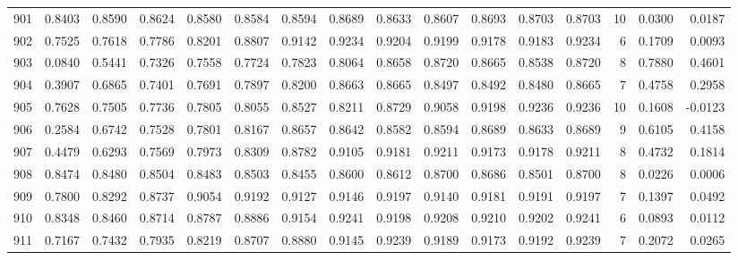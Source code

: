\begin{tabular}{lrrrrrrrrrrrrrrr}
901 &      0.8403 &  0.8590 &  0.8624 &  0.8580 &  0.8584 &  0.8594 &  0.8689 &  0.8633 &  0.8607 &  0.8693 &   0.8703 &     0.8703 &     10 &                    0.0300 &                     0.0187 \\
902 &      0.7525 &  0.7618 &  0.7786 &  0.8201 &  0.8807 &  0.9142 &  0.9234 &  0.9204 &  0.9199 &  0.9178 &   0.9183 &     0.9234 &      6 &                    0.1709 &                     0.0093 \\
903 &      0.0840 &  0.5441 &  0.7326 &  0.7558 &  0.7724 &  0.7823 &  0.8064 &  0.8658 &  0.8720 &  0.8665 &   0.8538 &     0.8720 &      8 &                    0.7880 &                     0.4601 \\
904 &      0.3907 &  0.6865 &  0.7401 &  0.7691 &  0.7897 &  0.8200 &  0.8663 &  0.8665 &  0.8497 &  0.8492 &   0.8480 &     0.8665 &      7 &                    0.4758 &                     0.2958 \\
905 &      0.7628 &  0.7505 &  0.7736 &  0.7805 &  0.8055 &  0.8527 &  0.8211 &  0.8729 &  0.9058 &  0.9198 &   0.9236 &     0.9236 &     10 &                    0.1608 &                    -0.0123 \\
906 &      0.2584 &  0.6742 &  0.7528 &  0.7801 &  0.8167 &  0.8657 &  0.8642 &  0.8582 &  0.8594 &  0.8689 &   0.8633 &     0.8689 &      9 &                    0.6105 &                     0.4158 \\
907 &      0.4479 &  0.6293 &  0.7569 &  0.7973 &  0.8309 &  0.8782 &  0.9105 &  0.9181 &  0.9211 &  0.9173 &   0.9178 &     0.9211 &      8 &                    0.4732 &                     0.1814 \\
908 &      0.8474 &  0.8480 &  0.8504 &  0.8483 &  0.8503 &  0.8455 &  0.8600 &  0.8612 &  0.8700 &  0.8686 &   0.8501 &     0.8700 &      8 &                    0.0226 &                     0.0006 \\
909 &      0.7800 &  0.8292 &  0.8737 &  0.9054 &  0.9192 &  0.9127 &  0.9146 &  0.9197 &  0.9140 &  0.9181 &   0.9191 &     0.9197 &      7 &                    0.1397 &                     0.0492 \\
910 &      0.8348 &  0.8460 &  0.8714 &  0.8787 &  0.8886 &  0.9154 &  0.9241 &  0.9198 &  0.9208 &  0.9210 &   0.9202 &     0.9241 &      6 &                    0.0893 &                     0.0112 \\
911 &      0.7167 &  0.7432 &  0.7935 &  0.8219 &  0.8707 &  0.8880 &  0.9145 &  0.9239 &  0.9189 &  0.9173 &   0.9192 &     0.9239 &      7 &                    0.2072 &                     0.0265 \\

\end{tabular}
